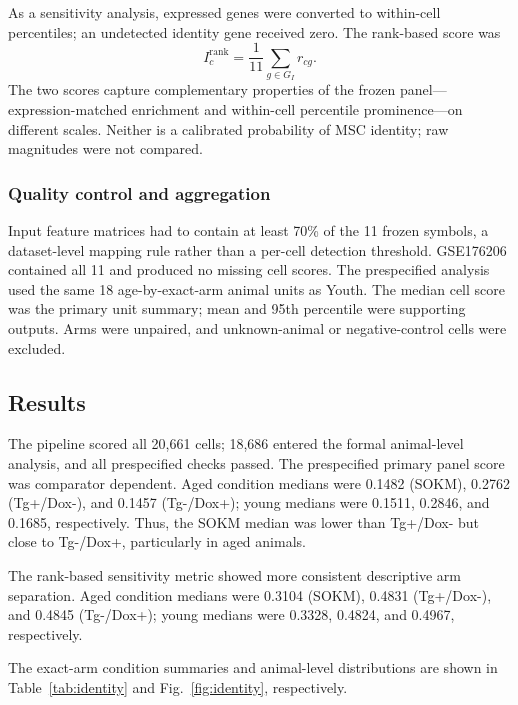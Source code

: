 \documentclass[10pt,twocolumn]{article}
\newcommand{\SOKM}{SOKM}
\begin{document}
As a sensitivity analysis, expressed genes were converted to within-cell percentiles; an undetected identity gene received zero. The rank-based score was
\begin{equation}
I_c^{\mathrm{rank}}=\frac{1}{11}\sum_{g\in G_I}r_{cg}.
\end{equation}
The two scores capture complementary properties of the frozen panel---expression-matched enrichment and within-cell percentile prominence---on different scales. Neither is a calibrated probability of MSC identity; raw magnitudes were not compared.

\subsubsection{Quality control and aggregation}

Input feature matrices had to contain at least 70\% of the 11 frozen symbols, a dataset-level mapping rule rather than a per-cell detection threshold. GSE176206 contained all 11 and produced no missing cell scores. The prespecified analysis used the same 18 age-by-exact-arm animal units as Youth. The median cell score was the primary unit summary; mean and 95th percentile were supporting outputs. Arms were unpaired, and unknown-animal or negative-control cells were excluded.

\subsection{Results}

The pipeline scored all 20,661 cells; 18,686 entered the formal animal-level analysis, and all prespecified checks passed. The prespecified primary panel score was comparator dependent. Aged condition medians were 0.1482 (\SOKM), 0.2762 (Tg+/Dox-), and 0.1457 (Tg-/Dox+); young medians were 0.1511, 0.2846, and 0.1685, respectively. Thus, the \SOKM{} median was lower than Tg+/Dox- but close to Tg-/Dox+, particularly in aged animals.

The rank-based sensitivity metric showed more consistent descriptive arm separation. Aged condition medians were 0.3104 (\SOKM), 0.4831 (Tg+/Dox-), and 0.4845 (Tg-/Dox+); young medians were 0.3328, 0.4824, and 0.4967, respectively.

The exact-arm condition summaries and animal-level distributions are shown in Table~\ref{tab:identity} and Fig.~\ref{fig:identity}, respectively.
\end{document}

